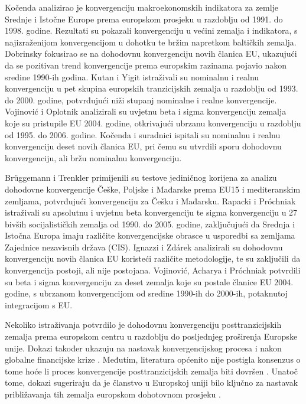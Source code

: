 \documentclass{crebsshr}
\begin{document}
    Kočenda \citeyearpar{Kočenda2001} analizirao je konvergenciju makroekonomskih indikatora za zemlje Srednje i Istočne Europe prema europskom prosjeku u razdoblju od 1991. do 1998. godine. Rezultati su pokazali konvergenciju u većini zemalja i indikatora, s najizraženijom konvergencijom u dohotku te bržim napretkom baltičkih zemalja. Dobrinsky \citeyearpar{Dobrinsky2003} fokusirao se na dohodovnu konvergenciju novih članica EU, ukazujući da se pozitivan trend konvergencije prema europskim razinama pojavio nakon sredine 1990-ih godina. Kutan i Yigit \citeyearpar{Kutan2004} istraživali su nominalnu i realnu konvergenciju u pet skupina europskih tranzicijskih zemalja u razdoblju od 1993. do 2000. godine, potvrđujući niži stupanj nominalne i realne konvergencije. Vojinović i Oplotnik \citeyearpar{Vojinović2004} analizirali su uvjetnu beta i sigma konvergenciju zemalja koje su pristupile EU 2004. godine, otkrivajući ubrzanu konvergenciju u razdoblju od 1995. do 2006. godine. Kočenda i suradnici \citeyearpar{Kočenda2006} ispitali su nominalnu i realnu konvergenciju deset novih članica EU, pri čemu su utvrdili sporu dohodovnu konvergenciju, ali bržu nominalnu konvergenciju.
    
    Brüggemann i Trenkler \citeyearpar{Brueggemann2007} primijenili su testove jediničnog korijena za analizu dohodovne konvergencije Češke, Poljske i Mađarske prema EU15 i mediteranskim zemljama, potvrđujući konvergenciju za Češku i Mađarsku. Rapacki i Próchniak \citeyearpar{Rapacki2009} istraživali su apsolutnu i uvjetnu beta konvergenciju te sigma konvergenciju u 27 bivših socijalističkih zemalja od 1990. do 2005. godine, zaključujući da Srednja i Istočna Europa imaju različite konvergencijske obrasce u usporedbi sa zemljama Zajednice nezavisnih država (CIS). Ignazzi i Zdárek \citeyearpar{Ignazzi2009} analizirali su dohodovnu konvergenciju novih članica EU koristeći različite metodologije, te su zaključili da konvergencija postoji, ali nije postojana. Vojinović, Acharya i Próchniak \citeyearpar{Vojinović2009} potvrdili su beta i sigma konvergenciju za deset zemalja koje su postale članice EU 2004. godine, s ubrzanom konvergencijom od sredine 1990-ih do 2000-ih, potaknutoj integracijom s EU.
    
    Nekoliko istraživanja potvrdilo je dohodovnu konvergenciju posttranzicijskih zemalja prema europskom centru \citep{Monfort2013, Próchniak2013, Szeles2010} u razdoblju do posljednjeg proširenja Europske unije. Dokazi također ukazuju na nastavak konvergencijskog procesa i nakon globalne financijske krize \citep{Åslund2018}. Međutim, literatura općenito nije postigla konsenzus o tome hoće li proces konvergencije posttranzicijskih zemalja biti dovršen \citep{Papi2018}. Unatoč tome, dokazi sugeriraju da je članstvo u Europskoj uniji bilo ključno za nastavak približavanja tih zemalja europskom dohotovnom prosjeku \citep{Rapacki2019}.
    
\end{document}
